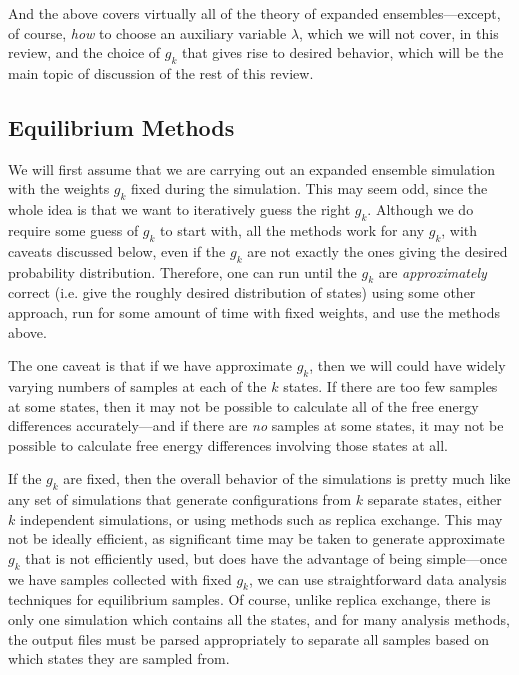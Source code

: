 \documentclass[superscriptaddress,showkeys, nofootinbib, pre, aps]{revtex4-1}
\begin{document}
And the above covers virtually all of the theory of expanded ensembles---except, of course, \emph{how} to choose an auxiliary variable $\lambda$, which we will not cover, in this review, and the choice of $g_k$ that gives rise to desired behavior, which will be the main topic of discussion of the rest of this review.

\subsection{\label{sec:equilibrium_methods}Equilibrium Methods}

We will first assume that we are carrying out an expanded ensemble simulation with the weights $g_k$ fixed during the simulation. This may seem odd, since the whole idea is that we want to iteratively guess the right $g_k$.  Although we do require some guess of $g_k$ to start with, all the methods work for any $g_k$, with caveats discussed below, even if the $g_k$ are not exactly the ones giving the desired probability distribution. Therefore, one can run until the $g_k$ are \emph{approximately} correct (i.e. give the roughly desired distribution of states) using some other approach, run for some amount of time with fixed weights, and use the methods above.  

The one caveat is that if we have approximate $g_k$, then we will could have widely varying numbers of samples at each of the $k$ states. If there are too few samples at some states, then it may not be possible to calculate all of the free energy differences accurately---and if there are \emph{no} samples at some states, it may not be possible to calculate free energy differences involving those states at all.   

If the $g_k$ are fixed, then the overall behavior of the simulations is pretty much like any set of simulations that generate configurations from $k$ separate states, either $k$ independent simulations, or using methods such as replica exchange.  This may not be ideally efficient, as significant time may be taken to generate approximate $g_k$ that is not efficiently used, but does have the advantage of being simple---once we have samples collected with fixed $g_k$, we can use straightforward data analysis techniques for equilibrium samples. Of course, unlike replica exchange, there is only one simulation which contains all the states, and for many analysis methods, the output files must be parsed appropriately to separate all samples based on which states they are sampled from.  
\end{document}
